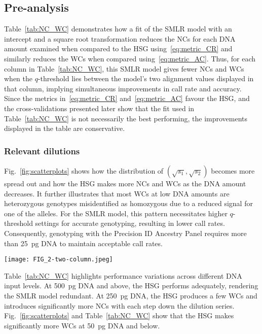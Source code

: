 \documentclass[preprint,5p,times,11pt]{elsarticle}
\begin{document}
\subsection{Pre-analysis}
Table~\ref{tab:NC_WC} demonstrates how a fit of the SMLR model with an intercept and a square root transformation reduces the NCs for each DNA amount examined when compared to the HSG using~\eqref{eq:metric_CR} and similarly reduces the WCs when compared using~\eqref{eq:metric_AC}.
Thus, for each column in Table~\ref{tab:NC_WC}, this SMLR model gives fewer NCs and WCs when the $q$-threshold lies between the model’s two alignment values displayed in that column, implying simultaneous improvements in call rate and accuracy.
Since the metrics in~\eqref{eq:metric_CR} and~\eqref{eq:metric_AC} favour the HSG, and the cross-validations presented later show that the fit used in Table~\ref{tab:NC_WC} is not necessarily the best performing, the improvements displayed in the table are conservative.



\subsubsection{Relevant dilutions}
Fig.~\ref{fig:scatterplots} shows how the distribution of $(\sqrt{s_1}, \sqrt{s_2})$ becomes more spread out and how the HSG makes more NCs and WCs as the DNA amount decreases.
It further illustrates that most WCs at low DNA amounts are heterozygous genotypes misidentified as homozygous due to a reduced signal for one of the alleles.
For the SMLR model, this pattern necessitates higher $q$-threshold settings for accurate genotyping, resulting in lower call rates.
Consequently, genotyping with the Precision ID Ancestry Panel requires more than \SI{25}{\pg} DNA to maintain acceptable call rates.
\begin{figure*}
\centering
\texttt{[image: FIG\_2-two-column.jpeg]}
\caption{
Distribution of square-root transformed allele signals.\\
A dot represents a set of read counts $(s_1, s_2)$ for an SNP and is coloured according to the true genotype: red for heterozygous and blue or yellow for homozygous genotypes.
The displayed DNA quantities indicate where the accuracy of the HID SNP Genotyper Plugin falls below 100\%, with its wrong calls marked by red crosses and no-calls by black pluses.
}
\label{fig:scatterplots}
\end{figure*}

Table~\ref{tab:NC_WC} highlights performance variations across different DNA input levels.
At \SI{500}{\pg} DNA and above, the HSG performs adequately, rendering the SMLR model redundant.
At \SI{250}{\pg} DNA, the HSG produces a few WCs and introduces significantly more NCs with each step down the dilution series.
Fig.~\ref{fig:scatterplots} and Table~\ref{tab:NC_WC} show that the HSG makes significantly more WCs at \SI{50}{\pg} DNA and below.
\end{document}
